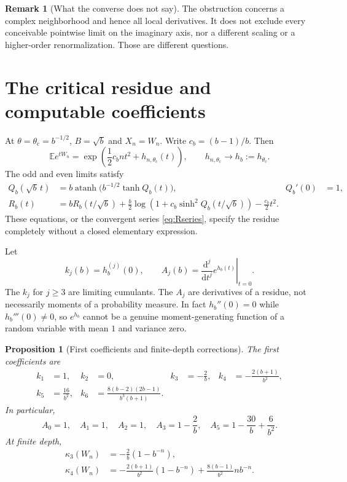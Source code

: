 \documentclass[11pt]{article}
\newtheorem{proposition}[theorem]{Proposition}
\theoremstyle{definition}
\newtheorem{remark}[theorem]{Remark}
\newcommand{\E}{\mathbb E}
\newcommand{\atanh}{\operatorname{atanh}}
\newcommand{\crit}{\theta_{\mathrm c}}
\begin{document}
\begin{remark}[What the converse does not say]
The obstruction concerns a complex neighborhood and hence all local
derivatives. It does not exclude every conceivable pointwise limit on
the imaginary axis, nor a different scaling or a higher-order
renormalization. Those are different questions.
\end{remark}

\section{The critical residue and computable coefficients}

At $\theta=\crit=b^{-1/2}$, $B=\sqrt b$ and $X_n=W_n$.
Write $c_b=(b-1)/b$. Then
\begin{equation}\label{eq:critical-mgf}
 \E e^{tW_n}=
      \exp\!\left(\frac12c_bnt^2+h_{n,\crit}(t)\right),
 \qquad h_{n,\crit}\longrightarrow h_b:=h_{\crit}.
\end{equation}
The odd and even limits satisfy
\begin{align}
 Q_b(\sqrt b\,t)&=b\atanh\bigl(b^{-1/2}\tanh Q_b(t)\bigr),
     &Q_b'(0)&=1,\label{eq:critical-Q}\\
 R_b(t)&=bR_b(t/\sqrt b)
   +\frac b2\log\!\left(1+c_b\sinh^2 Q_b(t/\sqrt b)\right)
   -\frac{c_b}2t^2.
 \label{eq:critical-R}
\end{align}
These equations, or the convergent series \eqref{eq:Rseries}, specify
the residue completely without a closed elementary expression.

Let
\begin{equation}\label{eq:coeff-def}
 k_j(b)=h_b^{(j)}(0),\qquad
 A_j(b)=\left.\frac{\mathrm d^j}{\mathrm dt^j}e^{h_b(t)}\right|_{t=0}.
\end{equation}
The $k_j$ for $j\geq3$ are limiting cumulants. The $A_j$ are derivatives
of a residue, not necessarily moments of a probability measure. In fact
$h_b''(0)=0$ while $h_b'''(0)\neq0$, so $e^{h_b}$ cannot be a genuine
moment-generating function of a random variable with mean $1$ and
variance zero.

\begin{proposition}[First coefficients and finite-depth corrections]
\label{prop:critical-coefficients}
The first coefficients are
\begin{align}
 k_1&=1,&k_2&=0,&k_3&=-\frac2b,&k_4&=-\frac{2(b+1)}{b^2},\label{eq:k34}\\
 k_5&=\frac{16}{b^2},&
 k_6&=\frac{8(b-2)(2b-1)}{b^3(b+1)}.\label{eq:k56}
\end{align}
In particular,
\begin{equation}\label{eq:Avalues}
 A_0=1,\quad A_1=1,\quad A_2=1,\quad
 A_3=1-\frac2b,\quad
 A_5=1-\frac{30}b+\frac6{b^2}.
\end{equation}
At finite depth,
\begin{align}
 \kappa_3(W_n)&=-\frac2b(1-b^{-n}),\label{eq:critical-k3n}\\
 \kappa_4(W_n)&=-\frac{2(b+1)}{b^2}(1-b^{-n})
                   +\frac{8(b-1)}{b^2}n b^{-n}.\label{eq:critical-k4n}
\end{align}
\end{proposition}
\end{document}
